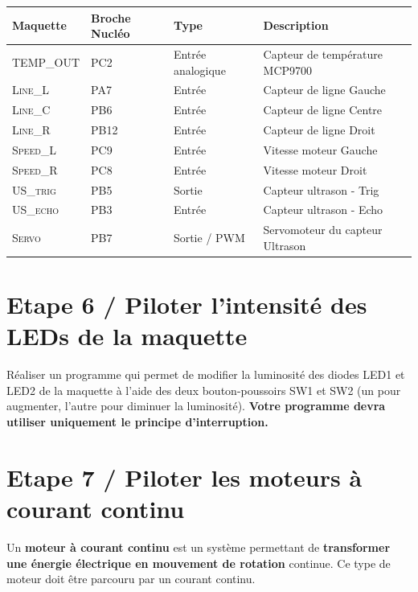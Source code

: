 \documentclass[a4paper,11pt,titlepage]{article} %
\begin{document}
\begin{center}
\begin{tabular}{|l|l|l|l|}
\hline 
Maquette & \textbf{Broche Nucléo} & Type & Description \\ 
\hline 
\textsc{TEMP\_OUT} & PC2 & Entrée analogique & Capteur de température MCP9700\\ 
\hline 
\textsc{Line\_L} & PA7 & Entrée & Capteur de ligne Gauche\\ 
\textsc{Line\_C} & PB6 & Entrée & Capteur de ligne Centre\\ 
\textsc{Line\_R} & PB12 & Entrée & Capteur de ligne Droit\\ 
\hline 
\textsc{Speed\_L} & PC9 & Entrée & Vitesse moteur Gauche\\ 
\textsc{Speed\_R} & PC8 & Entrée & Vitesse moteur Droit\\ 
\hline  
\textsc{US\_trig} & PB5 & Sortie & Capteur ultrason - Trig\\ 
\textsc{US\_echo} & PB3 & Entrée & Capteur ultrason - Echo\\ 
\textsc{Servo} & PB7 & Sortie / PWM & Servomoteur du capteur Ultrason\\ 
\hline  
\end{tabular} 
\end{center}




\section{Etape 6 / Piloter l'intensité des LEDs de la maquette}

\Manip Réaliser un programme qui permet de modifier la luminosité des diodes LED1 et LED2 de la maquette à l'aide des deux bouton-poussoirs SW1 et SW2 (un pour augmenter, l'autre pour diminuer la luminosité). \textbf{Votre programme devra utiliser uniquement le principe d'interruption.}


\newpage

\section{Etape 7 / Piloter les moteurs à courant continu}

Un \textbf{moteur à courant continu} est un système permettant de \textbf{transformer une énergie électrique en mouvement de rotation} continue. Ce type de moteur doit être parcouru par un courant continu.
\end{document}
